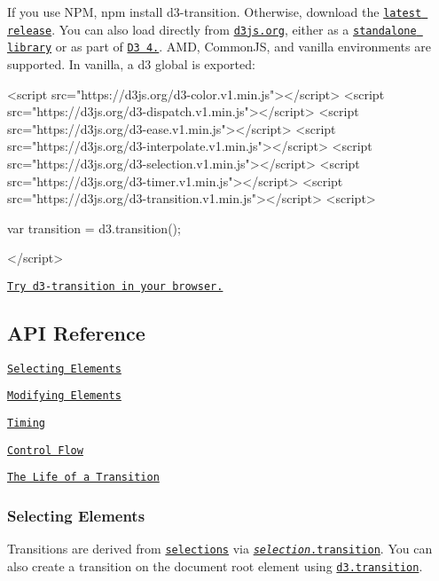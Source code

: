 If you use N\+PM, {\ttfamily npm install d3-\/transition}. Otherwise, download the \href{https://github.com/d3/d3-transition/releases/latest}{\tt latest release}. You can also load directly from \href{https://d3js.org}{\tt d3js.\+org}, either as a \href{https://d3js.org/d3-transition.v1.min.js}{\tt standalone library} or as part of \href{https://github.com/d3/d3}{\tt D3 4.}. A\+MD, Common\+JS, and vanilla environments are supported. In vanilla, a {\ttfamily d3} global is exported\+:


\begin{DoxyCode}
<script src="https://d3js.org/d3-color.v1.min.js"></script>
<script src="https://d3js.org/d3-dispatch.v1.min.js"></script>
<script src="https://d3js.org/d3-ease.v1.min.js"></script>
<script src="https://d3js.org/d3-interpolate.v1.min.js"></script>
<script src="https://d3js.org/d3-selection.v1.min.js"></script>
<script src="https://d3js.org/d3-timer.v1.min.js"></script>
<script src="https://d3js.org/d3-transition.v1.min.js"></script>
<script>

var transition = d3.transition();

</script>
\end{DoxyCode}


\href{https://tonicdev.com/npm/d3-transition}{\tt Try d3-\/transition in your browser.}

\subsection*{A\+PI Reference}


\begin{DoxyItemize}
\item \href{#selecting-elements}{\tt Selecting Elements}
\item \href{#modifying-elements}{\tt Modifying Elements}
\item \href{#timing}{\tt Timing}
\item \href{#control-flow}{\tt Control Flow}
\item \href{#the-life-of-a-transition}{\tt The Life of a Transition}
\end{DoxyItemize}

\subsubsection*{Selecting Elements}

Transitions are derived from \href{https://github.com/d3/d3-selection}{\tt selections} via \href{#selection_transition}{\tt {\itshape selection}.transition}. You can also create a transition on the document root element using \href{#transition}{\tt d3.\+transition}.

